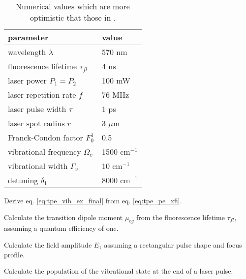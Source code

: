 \begin{table}
\begin{tabular}{ll}
parameter & value \\ \hline
wavelength $\lambda$ & 570 nm \\
fluorescence lifetime $\tau_{fl}$ & 4 ns \\
laser power $P_1 = P_2$ & 100 mW \\
laser repetition rate $f$ & 76 MHz \\
laser pulse width $\tau$ & 1 ps \\
laser spot radius $r$ & 3 $\mu$m \\
Franck-Condon factor $F_0^1$ & 0.5 \\
vibrational frequency $\Omega_v$ & 1500 cm$^{-1}$ \\
vibrational width $\Gamma_v$ & 10 cm$^{-1}$ \\
detuning $\delta_1$ & 8000 cm$^{-1}$
\end{tabular}
\caption{Numerical values which are more optimistic that those in \cite{Winterhalder11}.}
\end{table}


\begin{questions}
\item Derive eq. \ref{eq:tpe_vib_ex_final} from eq. \ref{eq:tpe_pe_xfi}.

\item Calculate the transition dipole moment $\mu_{eg}$ from the fluorescence lifetime $\tau_{fl}$, assuming a quantum efficiency of one.

\item Calculate the field amplitude $ E_1$ assuming a rectangular pulse shape and focus profile.

\item Calculate the population  of the vibrational state at the end of a laser pulse.

\end{questions}


\printbibliography[segment=\therefsegment,heading=subbibliography]
